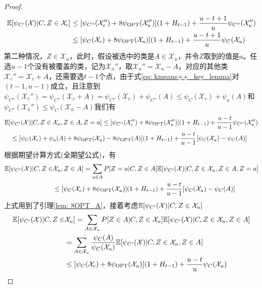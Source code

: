 \begin{proof}
\begin{align*}
        \mathbb{E}[\psi_{C'}(\mathcal{X})|C,Z \in \mathcal{X}_c] &\leq [\psi_{C''}(\mathcal{X}_c'')+8\psi_{\text{OPT}}(\mathcal{X}_u'')](1+H_{t-1}) + \frac{u-t+1}{u} \psi_{C''}(\mathcal{X}_u'') \\
        & \leq [\psi_{C}(\mathcal{X}_c)+8\psi_{\text{OPT}}(\mathcal{X}_u)](1+H_{t-1}) + \frac{u-t+1}{u} \psi_{C}(\mathcal{X}_u)
    \end{align*}
    第二种情况，$Z \in \mathcal{X}_u$，此时，假设被选中的类是$A \in \mathcal{X}_u$，并令$Z$取到的值是$a$。任选$u-1$个没有被覆盖的类，记为$\mathcal{X}_u''$，取$\mathcal{X}_u'' = \mathcal{X}_u - A$，对应的其他类$\mathcal{X}_c'' = \mathcal{X}_c + A$，还需要选$t-1$个点，由于式\ref{eq: kmeans++_key_lemma}对$(t-1,u-1)$成立，且注意到$\psi_{C''}(\mathcal{X}_c'') = \psi_{C''}(\mathcal{X}_c + A) = \psi_{C''}(\mathcal{X}_c) + \psi_{C''}(A) \leq \psi_{C}(\mathcal{X}_c) + \psi_{a}(A)$和$\psi_{C''}(\mathcal{X}_u'') \leq \psi_{C}(\mathcal{X}_u - A)$我们有
    \begin{align*}
        \mathbb{E}[& \psi_{C'}(\mathcal{X})|C, Z \in \mathcal{X}_u, Z \in A, Z=a] \leq [\psi_{C''}(\mathcal{X}_c'')+8\psi_{\text{OPT}}(\mathcal{X}_u'')](1+H_{t-1}) + \frac{u-t}{u-1} \psi_{C''}(\mathcal{X}_u'') \\
        &\leq [\psi_{C}(\mathcal{X}_c)+\psi_a(A)+8\psi_{\text{OPT}}(\mathcal{X}_u)-8\psi_{\text{OPT}}(A)](1+H_{t-1}) + \frac{u-t}{u-1}[\psi_C(\mathcal{X}_u)-\psi_C(A)]
    \end{align*}
    根据期望计算方式(全期望公式)，有
    \begin{align*}
        \mathbb{E}[\psi_{C'}(\mathcal{X})|C, Z \in & \mathcal{X}_u, Z \in A] =
            \sum_{a \in A} P[Z = a|C,Z \in A] \mathbb{E}[\psi_{C'}(\mathcal{X})|C, Z \in \mathcal{X}_u, Z \in A, Z=a] \\
            &\leq [\psi_{C}(\mathcal{X}_c)+8\psi_{\text{OPT}}(\mathcal{X}_u)](1+H_{t-1}) + \frac{u-t}{u-1}[\psi_C(\mathcal{X}_u)-\psi_C(A)]
    \end{align*}
    上式用到了引理\ref{lem: 8OPT_A}，接着考虑$\mathbb{E}[\psi_{C'}(\mathcal{X})|C, Z \in \mathcal{X}_u]$
    \begin{align*}
        \E[\psi_{C'}(\mathcal{X})|C, Z \in & \mathcal{X}_u] =
            \sum_{A \in \mathcal{X}_u} P[Z \in A|C, Z \in \mathcal{X}_u] \E[\psi_{C'}(\mathcal{X})|C, Z \in \mathcal{X}_u, Z \in A] \\
            &= \sum_{A \in \mathcal{X}_u} \frac{\psi_C(A)}{\psi_C(\mathcal{X}_u)} \E[\psi_{C'}(\mathcal{X})|C, Z \in \mathcal{X}_u, Z \in A] \\
            &\leq [\psi_{C}(\mathcal{X}_c)+8\psi_{\text{OPT}}(\mathcal{X}_u)](1+H_{t-1}) + \frac{u-t}{u} \psi_C(\mathcal{X}_u)

\end{align*}
\end{proof}
